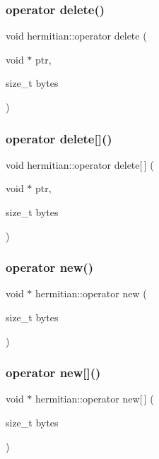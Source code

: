 \subsubsection{\texorpdfstring{operator delete()}{operator delete()}}
{\footnotesize\ttfamily void hermitian\+::operator delete (\begin{DoxyParamCaption}\item[{void $\ast$}]{ptr,  }\item[{size\+\_\+t}]{bytes }\end{DoxyParamCaption})}

\mbox{\label{classhermitian_a0e4272248e5a2d5dece9748cf6efad6a}} 
\subsubsection{\texorpdfstring{operator delete[]()}{operator delete[]()}}
{\footnotesize\ttfamily void hermitian\+::operator delete\mbox{[}$\,$\mbox{]} (\begin{DoxyParamCaption}\item[{void $\ast$}]{ptr,  }\item[{size\+\_\+t}]{bytes }\end{DoxyParamCaption})}

\mbox{\label{classhermitian_a618eb855fb2611605a5dfaca036bc1ab}} 
\subsubsection{\texorpdfstring{operator new()}{operator new()}}
{\footnotesize\ttfamily void $\ast$ hermitian\+::operator new (\begin{DoxyParamCaption}\item[{size\+\_\+t}]{bytes }\end{DoxyParamCaption})}

\mbox{\label{classhermitian_a1dc102d613c6e97873056711bee56b47}} 
\subsubsection{\texorpdfstring{operator new[]()}{operator new[]()}}
{\footnotesize\ttfamily void $\ast$ hermitian\+::operator new\mbox{[}$\,$\mbox{]} (\begin{DoxyParamCaption}\item[{size\+\_\+t}]{bytes }\end{DoxyParamCaption})}

